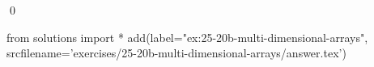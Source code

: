 
\begin{ex} 
  \label{ex:25-20b-multi-dimensional-arrays}
  
  \qed
\end{ex} 
\begin{python0}
from solutions import *
add(label="ex:25-20b-multi-dimensional-arrays",
    srcfilename='exercises/25-20b-multi-dimensional-arrays/answer.tex') 
\end{python0}
